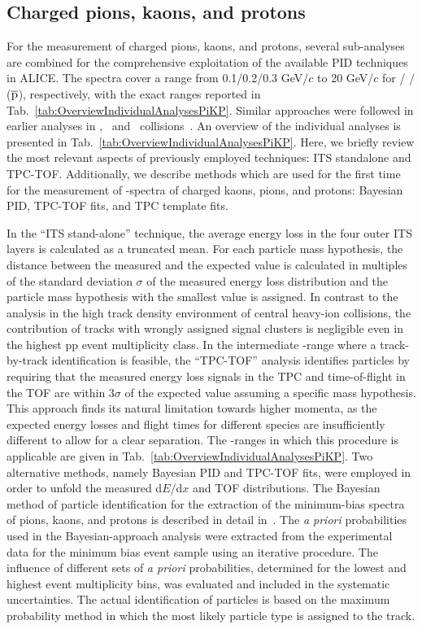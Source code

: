 \subsection{\label{subsecPiKP}Charged pions, kaons, and protons}

For the measurement of charged pions, kaons, and protons, several sub-analyses are combined for the comprehensive exploitation of the available PID techniques in ALICE. The spectra cover a range from 0.1/0.2/0.3 GeV/$c$ to 20 GeV/$c$ for \pipm/ \kapm/ \p($\rm\overline{p}$), respectively, with the exact ranges reported in Tab.~\ref{tab:OverviewIndividualAnalysesPiKP}. Similar approaches were followed in earlier analyses in \pp, \pPb\ and \PbPb\ collisions~\cite{Abelev:2013vea,Adam:2015qaa}.  An overview of the individual analyses is presented in Tab.~\ref{tab:OverviewIndividualAnalysesPiKP}. Here, we briefly review the most relevant aspects of previously employed techniques: ITS standalone and TPC-TOF. Additionally, we describe methods which are used for the first time for the measurement of \pt-spectra of charged kaons, pions, and protons: Bayesian PID, TPC-TOF fits, and TPC template fits.

In the ``ITS stand-alone'' technique, the average energy loss in the four outer ITS layers is calculated as a truncated mean. For each particle mass hypothesis, the distance between the measured and the expected value is calculated in multiples of the standard deviation $\sigma$ of the measured energy loss distribution and the particle mass hypothesis with the smallest value is assigned. In contrast to the analysis in the high track density environment of central heavy-ion collisions, the contribution of tracks with wrongly assigned signal clusters is negligible even in the highest pp event multiplicity class. 
In the intermediate \pt-range where a track-by-track identification is feasible, the ``TPC-TOF'' analysis identifies particles by requiring that the measured energy loss signals in the TPC and time-of-flight in the TOF are within 3$\sigma$ of the expected value assuming a specific mass hypothesis. This approach finds its natural limitation towards higher momenta, as the expected energy losses and flight times for different species are insufficiently different to allow for a clear separation. The \pt-ranges in which this procedure is applicable are given in Tab.~\ref{tab:OverviewIndividualAnalysesPiKP}. Two alternative methods, namely Bayesian PID and TPC-TOF fits, were employed in order to unfold the measured d$E$/d$x$ and TOF distributions. The Bayesian method of particle identification for the extraction of the minimum-bias spectra of pions, kaons, and protons is described in detail in~\cite{Adam:2016acv}. The {\it a priori} probabilities used in the Bayesian-approach analysis were extracted from the experimental data for the minimum bias event sample using an iterative procedure. The influence of different sets of {\it a priori} probabilities, determined for the lowest and highest event multiplicity bins, was evaluated and included in the systematic uncertainties. The actual identification of particles is based on the maximum probability method in which the most likely particle type is assigned to the track. 

